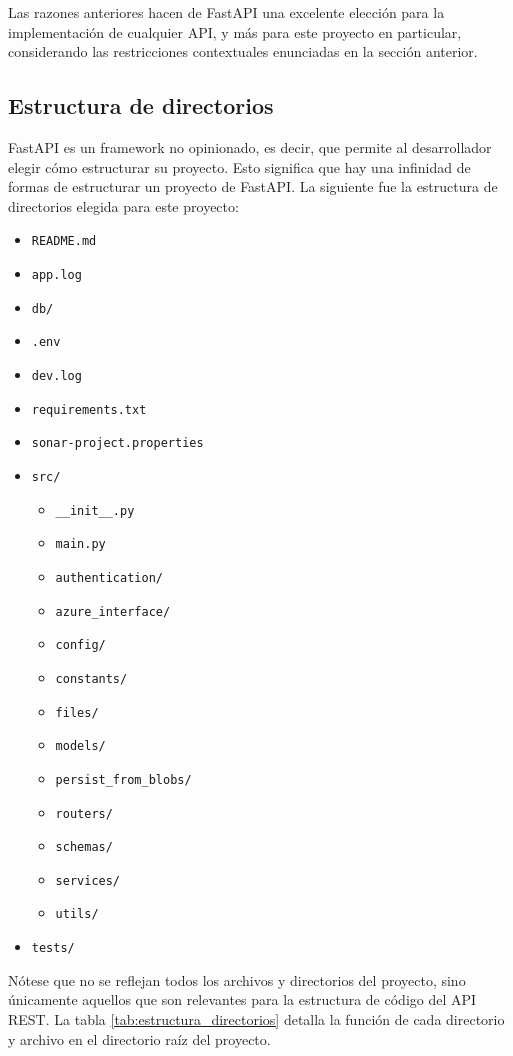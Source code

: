 Las razones anteriores hacen de \gls{FastAPI} una excelente elección para la implementación de cualquier \gls{API}, y más para este proyecto en particular, considerando las restricciones contextuales enunciadas en la sección anterior.

\subsection{Estructura de directorios}

\gls{FastAPI} es un framework no opinionado, es decir, que permite al desarrollador elegir cómo estructurar su proyecto. Esto significa que hay una infinidad de formas de estructurar un proyecto de \gls{FastAPI}. La siguiente fue la estructura de directorios elegida para este proyecto:
\begin{itemize}
	\item \texttt{README.md}
	\item \texttt{app.log}
	\item \texttt{db/}
	\item \texttt{.env}
	\item \texttt{dev.log}
	\item \texttt{requirements.txt}
	\item \texttt{sonar-project.properties}
	\item \texttt{src/}
	\begin{itemize}
			\item \texttt{\_\_init\_\_.py}
			\item \texttt{main.py}
			\item \texttt{authentication/}
			\item \texttt{azure\_interface/}
			\item \texttt{config/}
			\item \texttt{constants/}
			\item \texttt{files/}
			\item \texttt{models/}
			\item \texttt{persist\_from\_blobs/}
			\item \texttt{routers/}
			\item \texttt{schemas/}
			\item \texttt{services/}
			\item \texttt{utils/}
	\end{itemize}
	\item \texttt{tests/}
\end{itemize}

Nótese que no se reflejan todos los archivos y directorios del proyecto, sino únicamente aquellos que son relevantes para la estructura de código del \gls{API REST}. La tabla \ref{tab:estructura_directorios} detalla la función de cada directorio y archivo en el directorio raíz del proyecto.

